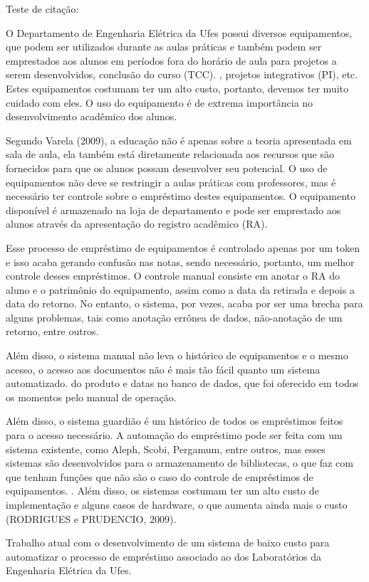 \vspace{-42pt}
Teste de citação: \cite{DepEngEle}

O Departamento de Engenharia Elétrica da Ufes possui diversos equipamentos, que podem ser utilizados durante as aulas práticas e também podem ser emprestados aos alunos em períodos fora do horário de aula para projetos a serem desenvolvidos, conclusão do curso (TCC). , projetos integrativos (PI), etc. Estes equipamentos costumam ter um alto custo, portanto, devemos ter muito cuidado com eles. O uso do equipamento é de extrema importância no desenvolvimento acadêmico dos alunos.
	
Segundo Varela (2009), a educação não é apenas sobre a teoria apresentada em sala de aula, ela também está diretamente relacionada aos recursos que são fornecidos para que os alunos possam desenvolver seu potencial. O uso de equipamentos não deve se restringir a aulas práticas com professores, mas é necessário ter controle sobre o empréstimo destes equipamentos. O equipamento disponível é armazenado na loja de departamento e pode ser emprestado aos alunos através da apresentação do registro acadêmico (RA).

Esse processo de empréstimo de equipamentos é controlado apenas por um token e isso acaba gerando confusão nas notas, sendo necessário, portanto, um melhor controle desses empréstimos. O controle manual consiste em anotar o RA do aluno e o patrimônio do equipamento, assim como a data da retirada e depois a data do retorno. No entanto, o sistema, por vezes, acaba por ser uma brecha para alguns problemas, tais como anotação errônea de dados, não-anotação de um retorno, entre outros.

Além disso, o sistema manual não leva o histórico de equipamentos e o mesmo acesso, o acesso aos documentos não é mais tão fácil quanto um sistema automatizado. do produto e datas no banco de dados, que foi oferecido em todos os momentos pelo manual de operação.

Além disso, o sistema guardião é um histórico de todos os empréstimos feitos para o acesso necessário. A automação do empréstimo pode ser feita com um sistema existente, como Aleph, Scobi, Pergamum, entre outros, mas esses sistemas são desenvolvidos para o armazenamento de bibliotecas, o que faz com que tenham funções que não são o caso do controle de empréstimos de equipamentos. . Além disso, os sistemas costumam ter um alto custo de implementação e alguns casos de hardware, o que aumenta ainda mais o custo (RODRIGUES e PRUDENCIO, 2009).

Trabalho atual com o desenvolvimento de um sistema de baixo custo para automatizar o processo de empréstimo associado ao dos Laboratórios da Engenharia Elétrica da Ufes.
